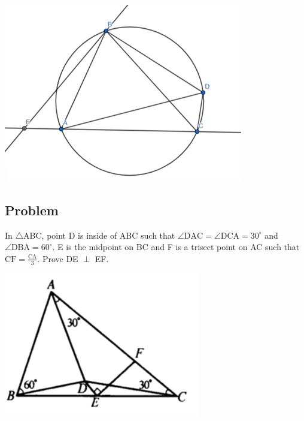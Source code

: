 \documentclass{article}
\begin{document}
\includegraphics{Picture20.png}

\pagebreak

\subsection{Problem}
In \(\triangle\)ABC, point D is inside of ABC such that \(\angle \mathrm{DAC} = \angle \mathrm{DCA}=30^{\circ} \) and \(\angle \mathrm{DBA}=60^{\circ}\). E is the midpoint on BC and F is a trisect point on AC such that \(\mathrm{CF} = \frac{\mathrm{CA}}{3} \). Prove DE \(\perp\) EF.

\includegraphics{Picture21.png}
\end{document}
